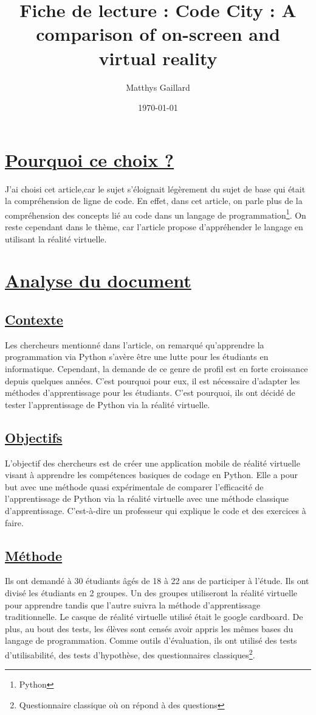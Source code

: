 \documentclass[a4paper,10pt, oneside]{article}
\title{Fiche de lecture : Code City : A comparison of on-screen and virtual reality}
\author{Matthys Gaillard}
\date{\today}
\begin{document}
\maketitle

\section{\ul{Pourquoi ce choix ?}}

        \par J'ai choisi cet article\cite{A3},car le sujet s'éloignait légèrement du sujet de base qui était la compréhension de ligne de code.
        En effet, dans cet article, on parle plus de la compréhension des concepts lié au code dans un langage de programmation\footnote{Python}.
        On reste cependant dans le thème, car l'article propose d'appréhender le langage en utilisant la réalité virtuelle.
        
\section{\ul{Analyse du document}}
\subsection{\ul{Contexte}} 
        \par Les chercheurs mentionné dans l'article, on remarqué qu'apprendre la programmation via Python s'avère être une lutte pour les étudiants en informatique.
        Cependant, la demande de ce genre de profil est en forte croissance depuis quelques années. C'est pourquoi pour eux, il est nécessaire d'adapter les méthodes
        d'apprentissage pour les étudiants. C'est pourquoi, ils ont décidé de tester l'apprentissage de Python via la réalité virtuelle.
\subsection{\ul{Objectifs}}
        \par L'objectif des chercheurs est de créer une application mobile de réalité virtuelle visant à apprendre les compétences basiques de codage en Python.
        Elle a pour but avec une méthode quasi expérimentale de comparer l'efficacité de l'apprentissage de Python via la réalité virtuelle avec une méthode classique d'apprentissage. C'est-à-dire
        un professeur qui explique le code et des exercices à faire.
\subsection{\ul{Méthode}}
        \par Ils ont demandé à 30 étudiants âgés de 18 à 22 ans de participer à l'étude. Ils ont divisé les étudiants en 2 groupes. Un des groupes utiliseront la réalité virtuelle pour apprendre
        tandis que l'autre suivra la méthode d'apprentissage traditionnelle. Le casque de réalité virtuelle utilisé était le google cardboard. De plus, au bout des tests, les élèves sont censés avoir
        appris les mêmes bases du langage de programmation. Comme outils d'évaluation, ils ont utilisé des tests d'utilisabilité, des tests d'hypothèse, des questionnaires classiques\footnote{Questionnaire classique où on répond à des questions}.
\end{document}
